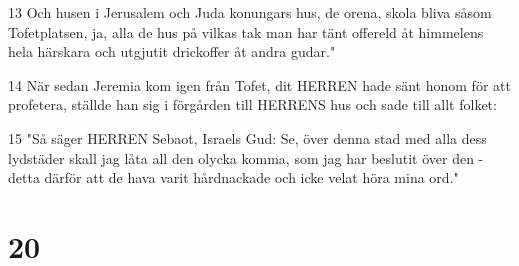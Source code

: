 \par 13 Och husen i Jerusalem och Juda konungars hus, de orena, skola bliva såsom Tofetplatsen, ja, alla de hus på vilkas tak man har tänt offereld åt himmelens hela härskara och utgjutit drickoffer åt andra gudar."
\par 14 När sedan Jeremia kom igen från Tofet, dit HERREN hade sänt honom för att profetera, ställde han sig i förgården till HERRENS hus och sade till allt folket:
\par 15 "Så säger HERREN Sebaot, Israels Gud: Se, över denna stad med alla dess lydstäder skall jag låta all den olycka komma, som jag har beslutit över den - detta därför att de hava varit hårdnackade och icke velat höra mina ord."

\chapter{20}

